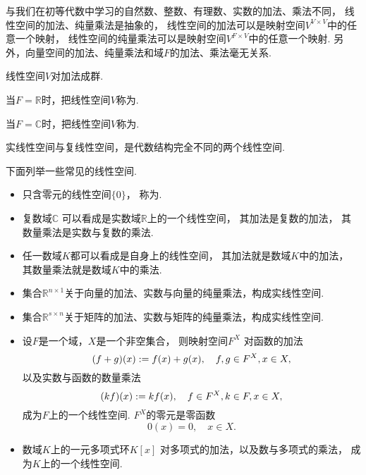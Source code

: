 \begin{remark}
与我们在初等代数中学习的自然数、整数、有理数、实数的加法、乘法不同，
线性空间的加法、纯量乘法是抽象的，
线性空间的加法可以是映射空间\(V^{V \times V}\)中的任意一个映射，
线性空间的纯量乘法可以是映射空间\(V^{F \times V}\)中的任意一个映射.
另外，向量空间的加法、纯量乘法和域\(F\)的加法、乘法毫无关系.
\end{remark}
\begin{remark}
线性空间\(V\)对加法成群.
\end{remark}

当\(F = \mathbb{R}\)时，把线性空间\(V\)称为.

当\(F = \mathbb{C}\)时，把线性空间\(V\)称为.

实线性空间与复线性空间，是代数结构完全不同的两个线性空间.

\begin{example}
下面列举一些常见的线性空间.
\begin{itemize}
	\item 只含零元的线性空间\(\{0\}\)，
	称为.

	\item 复数域\(\mathbb{C}\)
	可以看成是实数域\(\mathbb{R}\)上的一个线性空间，
	其加法是复数的加法，
	其数量乘法是实数与复数的乘法.

	\item 任一数域\(K\)都可以看成是自身上的线性空间，
	其加法就是数域\(K\)中的加法，
	其数量乘法就是数域\(K\)中的乘法.

	\item 集合\(\mathbb{R}^{n \times 1}\)关于向量的加法、实数与向量的纯量乘法，构成实线性空间.

	\item 集合\(\mathbb{R}^{s \times n}\)关于矩阵的加法、实数与矩阵的纯量乘法，构成实线性空间.

	\item 设\(F\)是一个域，\(X\)是一个非空集合，
	则映射空间\(F^X\)
	对函数的加法\[
		(f+g)(x) := f(x) + g(x),
		\quad f,g \in F^X, x \in X,
	\]
	以及实数与函数的数量乘法\[
		(k f)(x) := k f(x),
		\quad f \in F^X, k \in F, x \in X,
	\]
	成为\(F\)上的一个线性空间.
	\(F^X\)的零元是零函数\[
		0(x) = 0,
		\quad x \in X.
	\]

	\item 数域\(K\)上的一元多项式环\(K[x]\)
	对多项式的加法，以及数与多项式的乘法，
	成为\(K\)上的一个线性空间.
\end{itemize}
\end{example}

